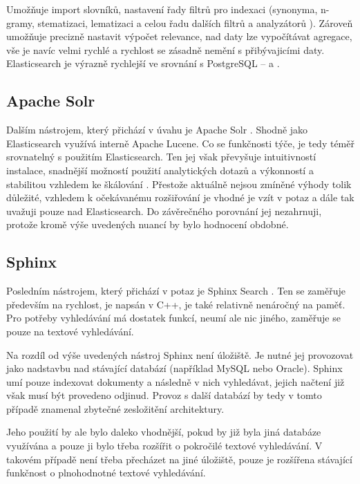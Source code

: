 \documentclass[FM,DP]{tulthesis}
\begin{document}
Umožňuje import slovníků, nastavení řady filtrů pro indexaci (synonyma, n-gramy, stematizaci, 
lematizaci a celou řadu dalších filtrů a analyzátorů \cite{es-analysis}). Zároveň umožňuje
precizně nastavit výpočet relevance, nad daty lze vypočítávat agregace, vše je navíc
velmi rychlé a rychlost se zásadně nemění s přibývajicími daty. Elasticsearch je výrazně 
rychlejší ve srovnání s PostgreSQL -- \cite{es-postgres} a \cite{es-postgres-2}.

\subsection{Apache Solr}

Dalším nástrojem, který přichází v úvahu je Apache Solr \cite{solr}. Shodně jako Elasticsearch 
využívá interně Apache Lucene. Co se funkčnosti týče, je tedy téměř srovnatelný s použitím
Elasticsearch. Ten jej však převyšuje intuitivností instalace, snadnější možností použití 
analytických dotazů a výkonností a stabilitou vzhledem ke škálování \cite{es-solr}. Přestože 
aktuálně nejsou zmíněné výhody tolik důležité, vzhledem k očekávanému rozšiřování je vhodné 
je vzít v potaz a dále tak uvažuji pouze nad Elasticsearch. Do závěrečného porovnání jej
nezahrnuji, protože kromě výše uvedených nuancí by bylo hodnocení obdobné.

\subsection{Sphinx}

Posledním nástrojem, který přichází v potaz je Sphinx Search \cite{sphinx}. Ten se zaměřuje 
především na rychlost, je napsán v C++, je také relativně nenáročný na paměť. 
Pro potřeby vyhledávání má dostatek funkcí, neumí ale nic jiného, zaměřuje se
pouze na textové vyhledávání.

Na rozdíl od výše uvedených nástroj Sphinx není úložiště. Je nutné jej provozovat
jako nadstavbu nad stávající databází (například MySQL nebo Oracle). Sphinx umí pouze 
indexovat dokumenty a následně v nich vyhledávat, jejich načtení již však musí být provedeno 
odjinud. Provoz s další databází by tedy v tomto případě znamenal zbytečné zesložitění architektury. 

Jeho použití by ale bylo daleko vhodnější, pokud by již byla jiná databáze využívána a pouze 
ji bylo třeba rozšířit o pokročilé textové vyhledávání. V takovém případě není třeba
přecházet na jiné úložiště, pouze je rozšířena stávající funkčnost o plnohodnotné
textové vyhledávání.
\end{document}

